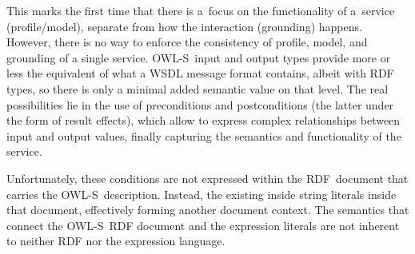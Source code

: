 \documentclass[smallextended]{svjour3}
\newcommand{\owls}{\mbox{OWL-S}}
\begin{document}
This marks the first time that there is a~focus on the functionality of a~service (profile/model), separate from how the interaction (grounding) happens.
However, there is no way to enforce the consistency of profile, model, and grounding of a single service. 
\owls\ input and output types provide more or less the equivalent of what a WSDL message format contains, albeit with RDF types, so there is only a minimal added semantic value on that level. The real possibilities lie in the use of preconditions and postconditions (the latter under the form of result effects), which allow to express complex relationships between input and output values, finally capturing the semantics and functionality of the service.

Unfortunately, these conditions are not expressed within the RDF~document that carries the \owls\ description.
Instead, the existing inside string literals inside that document, effectively forming another document context.
The semantics that connect the \owls\ RDF document and the expression literals are not inherent to neither RDF nor the expression language.
\end{document}
